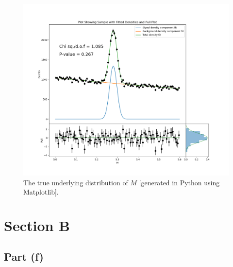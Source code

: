 \documentclass[12pt]{article}
\begin{document}
\begin{figure}[hbt]
    \includegraphics[scale=0.4]{part_e_plot.png}
    \caption{The true underlying distribution of $M$ [generated in Python using Matplotlib].}
    \label{part_e_plot}
\end{figure}

\section*{Section B}

\subsection*{Part (f)}
\end{document}
